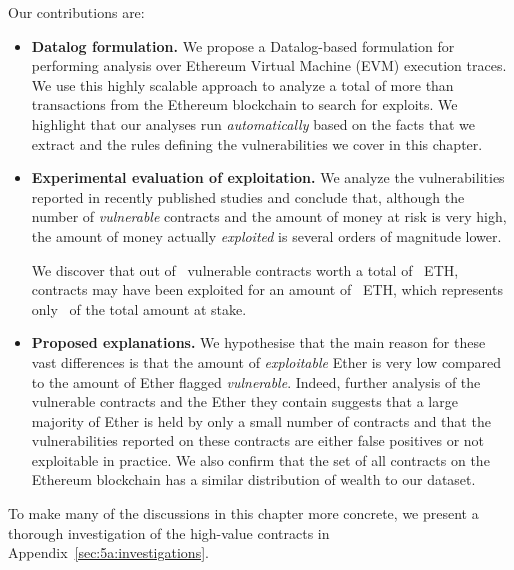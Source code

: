  Our contributions are:\itemsep=0pt
\begin{itemize}\itemsep=-2pt
\item \textbf{Datalog formulation.}
    We propose a Datalog-based formulation for performing analysis over Ethereum Virtual Machine (EVM) execution traces. We use this highly scalable approach to analyze a total of more than~ transactions from the Ethereum blockchain to search for exploits. We highlight that our analyses run \emph{automatically} based on the facts that we extract and the rules defining the vulnerabilities we cover in this chapter.

\item \textbf{Experimental evaluation of exploitation.}
    We analyze the vulnerabilities reported in \PapersAnalyzed recently published studies and conclude that, although the number of \emph{vulnerable} contracts and the amount of money at risk is very high, the amount of money actually \emph{exploited} is several orders of magnitude lower.

    We discover that out of~\empirical{\VulnerableContracts} vulnerable contracts worth a total of~\empirical{\EtherStake} ETH,~\empirical{\NumExploitedContracts} contracts may have been exploited for an amount of~\empirical{\ExploitedEther} ETH, which represents only~\empirical{\PercentExploitedEther} of the total amount at stake.

\item \textbf{Proposed explanations.}
    We hypothesise that the main reason for these vast differences is that the amount of \emph{exploitable} Ether is very low compared to the amount of Ether flagged \emph{vulnerable}.
    Indeed, further analysis of the vulnerable contracts and the Ether they contain suggests that a large majority of Ether is held by only a small number of contracts and that the vulnerabilities reported on these contracts are either false positives or not exploitable in practice. We also confirm that the set of all contracts on the Ethereum blockchain has a similar distribution of wealth to our dataset.
\end{itemize}
To make many of the discussions in this chapter more concrete, we present a thorough investigation of the high-value contracts in Appendix~\ref{sec:5a:investigations}. 


